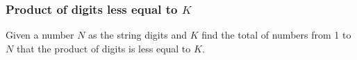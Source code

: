 \subsubsection{Product of digits less equal to $K$}

Given a number $N$ as the string digits and $K$ find the total of numbers from 1 to $N$ that the product of digits is less equal to $K$.


